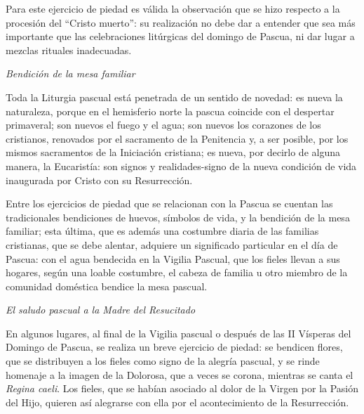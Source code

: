 			\begin{bodyintro}Para este ejercicio de piedad es válida la observación que se hizo respecto a la procesión del “Cristo muerto”: su realización no debe dar a entender que sea más importante que las celebraciones litúrgicas del domingo de Pascua, ni dar lugar a mezclas rituales inadecuadas.\end{bodyintro}
			
			\begin{bodyintro}\textit{Bendición de la mesa familiar}\end{bodyintro}
			
			\begin{bodyintro}Toda la Liturgia pascual está penetrada de un sentido de novedad: es nueva la naturaleza, porque en el hemisferio norte la pascua coincide con el despertar primaveral; son nuevos el fuego y el agua; son nuevos los corazones de los cristianos, renovados por el sacramento de la Penitencia y, a ser posible, por los mismos sacramentos de la Iniciación cristiana; es nueva, por decirlo de alguna manera, la Eucaristía: son signos y realidades-signo de la nueva condición de vida inaugurada por Cristo con su Resurrección.\end{bodyintro}
			
			\begin{bodyintro}Entre los ejercicios de piedad que se relacionan con la Pascua se cuentan las tradicionales bendiciones de huevos, símbolos de vida, y la bendición de la mesa familiar; esta última, que es además una costumbre diaria de las familias cristianas, que se debe alentar, adquiere un significado particular en el día de Pascua: con el agua bendecida en la Vigilia Pascual, que los fieles llevan a sus hogares, según una loable costumbre, el cabeza de familia u otro miembro de la comunidad doméstica bendice la mesa pascual.\end{bodyintro}
			
			\begin{bodyintro}\textit{El saludo pascual a la Madre del Resucitado}\end{bodyintro}
			
			\begin{bodyintro}En algunos lugares, al final de la Vigilia pascual o después de las II Vísperas del Domingo de Pascua, se realiza un breve ejercicio de piedad: se bendicen flores, que se distribuyen a los fieles como signo de la alegría pascual, y se rinde homenaje a la imagen de la Dolorosa, que a veces se corona, mientras se canta el \textit{Regina caeli}. Los fieles, que se habían asociado al dolor de la Virgen por la Pasión del Hijo, quieren así alegrarse con ella por el acontecimiento de la Resurrección.\end{bodyintro}
			
